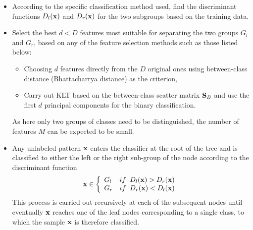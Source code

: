 \documentclass{article}
\begin{document}
\begin{itemize}
\item According to the specific classification method used, find
  the discriminant functions $D_l({\bf x})$ and $D_r({\bf x})$ for the
  two subgroups based on the training data.

\item Select the best $d<D$ features most suitable for separating the 
  two groups $G_l$ and $G_r$, based on any of the feature selection 
  methods such as those listed below:
  \begin{itemize}
  \item Choosing $d$ features directly from the $D$ original ones using 
    between-class distance (Bhattacharrya distance) as the criterion,
      
  \item Carry out KLT based on the between-class scatter matrix ${\bf S}_B$
    and use the first $d$ principal components for the binary classification.
  \end{itemize}
  As here only two groups of classes need to be distinguished, the number
  of features $M$ can be expected to be small.

\item Any unlabeled pattern ${\bf x}$ enters the classifier at the root of
    the tree and is classified to either the left or the right sub-group
    of the node according to the discriminant function
    \begin{equation} 
      {\bf x} \in \left\{ \begin{array}{ll} G_l & if \;\;D_l({\bf x}) > D_r({\bf x}) \\
        G_r & if \;\;D_r({\bf x}) < D_l({\bf x}) \end{array} \right. 
    \end{equation}
    This process is carried out recursively at each of the subsequent nodes
    until eventually ${\bf x}$ reaches one of the leaf nodes corresponding 
    to a single class, to which the sample ${\bf x}$ is therefore classified. 
\end{itemize}
\end{document}
